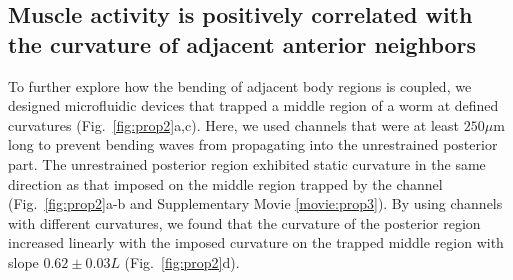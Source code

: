 \subsection{Muscle activity is positively correlated with the curvature of adjacent anterior 
neighbors}
 
To further explore how the bending of adjacent body regions is coupled, we designed 
microfluidic devices that trapped a middle region of a worm at defined curvatures (Fig.~\ref{fig:prop2}a,c). 
Here, we used channels that were at least $250 \mu$m long to prevent bending waves from 
propagating into the unrestrained posterior part. The unrestrained posterior region exhibited 
static curvature in the same direction as that imposed on the middle region trapped by the 
channel (Fig.~\ref{fig:prop2}a-b and Supplementary Movie  \ref{movie:prop3}). By using channels with different curvatures, we 
found that the curvature of the posterior region increased linearly with the imposed curvature on 
the trapped middle region with slope $0.62 \pm 0.03 L$ (Fig.~\ref{fig:prop2}d). 



